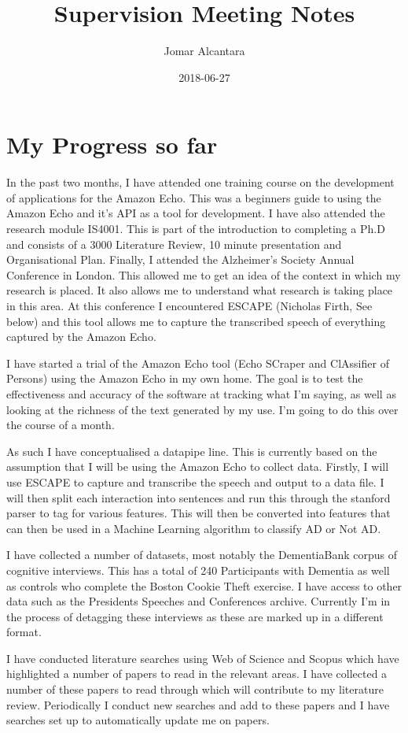 \documentclass[a4paper]{article}
\title{Supervision Meeting Notes}
\date{2018-06-27}
\author{Jomar Alcantara}
\begin{document}
\maketitle
\section{My Progress so far}
In the past two months, I have attended one training course on the development of applications for the Amazon Echo. This was a beginners guide to using the Amazon Echo and it's API as a tool for development. I have also attended the research module IS4001. This is part of the introduction to completing a Ph.D and consists of a 3000 Literature Review, 10 minute presentation and Organisational Plan. Finally, I attended the Alzheimer's Society Annual Conference in London. This allowed me to get an idea of the context in which my research is placed. It also allows me to understand what research is taking place in this area. At this conference I encountered ESCAPE (Nicholas Firth, See below) and this tool allows me to capture the transcribed speech of everything captured by the Amazon Echo. \newline
\par 
I have started a trial of the Amazon Echo tool (Echo SCraper and ClAssifier of Persons) using the Amazon Echo in my own home. The goal is to test the effectiveness and accuracy of the software at tracking what I'm saying, as well as looking at the richness of the text generated by my use. I'm going to do this over the course of a month. \newline
\par 
As such I have conceptualised a datapipe line. This is currently based on the assumption that I will be using the Amazon Echo to collect data. Firstly, I will use ESCAPE to capture and transcribe the speech and output to a data file. I will then split each interaction into sentences and run this through the stanford parser to tag for various features. This will then be converted into features that can then be used in a Machine Learning algorithm to classify AD or Not AD. \newline
\par
I have collected a number of datasets, most notably the DementiaBank corpus of cognitive interviews. This has a total of 240 Participants with Dementia as well as controls who complete the Boston Cookie Theft exercise. I have access to other data such as the Presidents Speeches and Conferences archive. Currently I'm in the process of detagging these interviews as these are marked up in a different format. \newline
\par
I have conducted literature searches using Web of Science and Scopus which have highlighted a number of papers to read in the relevant areas. I have collected a number of these papers to read through which will contribute to my literature review. Periodically I conduct new searches and add to these papers and I have searches set up to automatically update me on papers.
\end{document}
